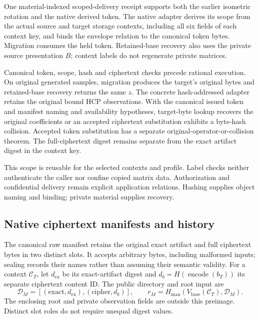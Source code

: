 One material-indexed scoped-delivery receipt supports both the earlier
isometric rotation and the native derived token. The native adapter derives
its scope from the actual source and target storage contexts, including
all six fields of each context key, and binds the envelope relation to the
canonical token bytes. Migration consumes the held token. Retained-base
recovery also uses the private source presentation \(B\); context labels do
not regenerate private matrices.

Canonical token, scope, hash and ciphertext checks precede rational
execution. On original generated samples, migration produces the target's
original bytes and retained-base recovery returns the same \(z\). The
concrete hash-addressed adapter retains the original bound HCP observations.
With the canonical issued token and manifest naming and availability
hypotheses, target-byte lookup recovers the original coefficients or an
accepted ciphertext substitution exhibits a byte-hash collision. Accepted
token substitution has a separate original-operator-or-collision theorem.
The full-ciphertext digest remains separate from the
exact artifact digest in the context key.

This scope is reusable for the selected contexts and profile. Label checks
neither authenticate the caller nor confine copied matrix data. Authorization
and confidential delivery remain explicit application relations. Hashing
supplies object naming and binding; private material supplies recovery.

\subsection{Native ciphertext manifests and history}

The canonical raw manifest retains the original exact artifact and full
ciphertext bytes in two distinct slots. It accepts arbitrary bytes, including
malformed inputs; sealing records their names rather than assuming their
semantic validity. For a context
\(\mathcal C_T\), let \(d_{\mathrm{ex}}\) be its exact-artifact digest and
\(d_b=H(\operatorname{encode}(b_T))\) its separate ciphertext content ID.
The public directory and root input are
\[
 \mathcal D_M=[(\mathrm{exact},d_{\mathrm{ex}}),(\mathrm{cipher},d_b)],
 \qquad
 r_M=H_{\mathrm{man}}(V_{\mathrm{base}}(\mathcal C_T),\mathcal D_M).
\]
The enclosing root and private observation fields are outside this preimage.
Distinct slot roles do not require unequal digest values.

